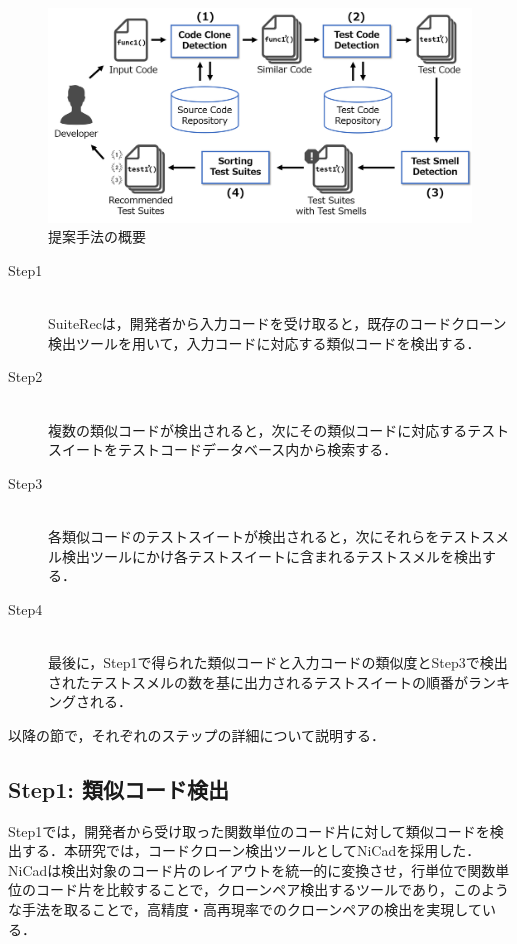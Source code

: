 \documentclass[12pt]{jarticle} %
\begin{document}
\begin{figure}[htbp]
  \begin{center}
    \includegraphics[clip,width=15cm]{SuiteRec-outline.pdf}
    \caption{提案手法の概要}
    \label{SO}
  \end{center}
\end{figure}

\begin{description}
\item[Step1]~\\
{\sf SuiteRec}は，開発者から入力コードを受け取ると，既存のコードクローン検出ツールを用いて，入力コードに対応する類似コードを検出する．
\item[Step2]~\\
複数の類似コードが検出されると，次にその類似コードに対応するテストスイートをテストコードデータベース内から検索する．
\item[Step3]~\\
各類似コードのテストスイートが検出されると，次にそれらをテストスメル検出ツールにかけ各テストスイートに含まれるテストスメルを検出する．
\item[Step4]~\\
最後に，Step1で得られた類似コードと入力コードの類似度とStep3で検出されたテストスメルの数を基に出力されるテストスイートの順番がランキングされる．
\end{description}

以降の節で，それぞれのステップの詳細について説明する．

\subsection{Step1: 類似コード検出}

Step1では，開発者から受け取った関数単位のコード片に対して類似コードを検出する．本研究では，コードクローン検出ツールとして{\sf NiCad}\cite{b2}を採用した．{\sf NiCad}は検出対象のコード片のレイアウトを統一的に変換させ，行単位で関数単位のコード片を比較することで，クローンペア検出するツールであり，このような手法を取ることで，高精度・高再現率でのクローンペアの検出を実現している．
\end{document}
